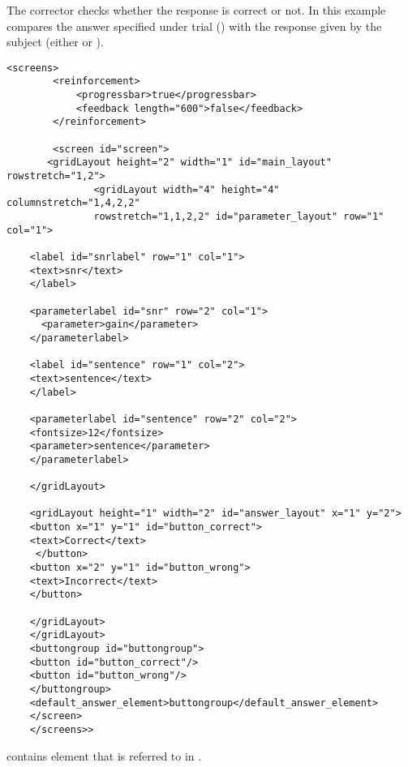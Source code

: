 The corrector checks whether the response is correct or not. In
this example  compares the answer specified
under trial () with the response given by the
subject (either  or ).

\begin{lstlisting}
<screens>
        <reinforcement>
            <progressbar>true</progressbar>
            <feedback length="600">false</feedback>
        </reinforcement>

        <screen id="screen">
       <gridLayout height="2" width="1" id="main_layout" rowstretch="1,2">
               <gridLayout width="4" height="4" columnstretch="1,4,2,2"
               rowstretch="1,1,2,2" id="parameter_layout" row="1" col="1">

    <label id="snrlabel" row="1" col="1">
    <text>snr</text>
    </label>

    <parameterlabel id="snr" row="2" col="1">
      <parameter>gain</parameter>
    </parameterlabel>

    <label id="sentence" row="1" col="2">
    <text>sentence</text>
    </label>

    <parameterlabel id="sentence" row="2" col="2">
    <fontsize>12</fontsize>
    <parameter>sentence</parameter>
    </parameterlabel>

    </gridLayout>

    <gridLayout height="1" width="2" id="answer_layout" x="1" y="2">
    <button x="1" y="1" id="button_correct">
    <text>Correct</text>
     </button>
    <button x="2" y="1" id="button_wrong">
    <text>Incorrect</text>
    </button>

    </gridLayout>
    </gridLayout>
    <buttongroup id="buttongroup">
    <button id="button_correct"/>
    <button id="button_wrong"/>
    </buttongroup>
    <default_answer_element>buttongroup</default_answer_element>
    </screen>
    </screens>>
\end{lstlisting}

 contains  element that is
referred to in .

